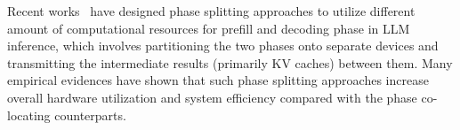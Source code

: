 Recent works~\cite{patel2023splitwise,hu2024inference,qin2024mooncake,jin2024p} have designed phase splitting approaches to utilize different amount of computational resources for prefill and decoding phase in LLM inference, which involves partitioning the two phases onto separate devices and transmitting the intermediate results (primarily KV caches) between them.
Many empirical evidences have shown that such phase splitting approaches increase overall hardware utilization and system efficiency compared with the phase co-locating counterparts.







